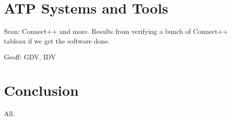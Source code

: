 \documentclass[runningheads]{llncs}
\begin{document}
\section{ATP Systems and Tools}
\label{SystemsTools}

Sean:
Connect++ and more.
Results from verifying a bunch of Connect++ tableau if we get the software done.

Geoff: GDV, IDV

\section{Conclusion}
\label{Conclusion}

All.



\end{document}

